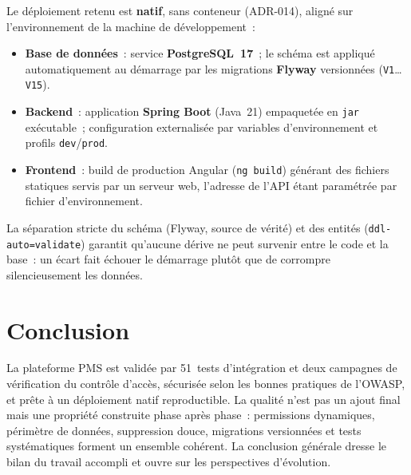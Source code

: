 Le déploiement retenu est \textbf{natif}, sans conteneur (ADR-014), aligné sur l'environnement de la
machine de développement~:

\begin{itemize}
  \item \textbf{Base de données}~: service \textbf{PostgreSQL~17}~; le schéma est appliqué
        automatiquement au démarrage par les migrations \textbf{Flyway} versionnées
        (\texttt{V1}\dots\texttt{V15}).
  \item \textbf{Backend}~: application \textbf{Spring Boot} (Java~21) empaquetée en \texttt{jar}
        exécutable~; configuration externalisée par variables d'environnement et profils
        \texttt{dev}/\texttt{prod}.
  \item \textbf{Frontend}~: build de production Angular (\texttt{ng build}) générant des fichiers
        statiques servis par un serveur web, l'adresse de l'API étant paramétrée par fichier
        d'environnement.
\end{itemize}

\noindent La séparation stricte du schéma (Flyway, source de vérité) et des entités
(\texttt{ddl-auto=validate}) garantit qu'aucune dérive ne peut survenir entre le code et la base~:
un écart fait échouer le démarrage plutôt que de corrompre silencieusement les données.

\section*{Conclusion}
La plateforme PMS est validée par 51~tests d'intégration et deux campagnes de vérification du
contrôle d'accès, sécurisée selon les bonnes pratiques de l'OWASP, et prête à un déploiement natif
reproductible. La qualité n'est pas un ajout final mais une propriété construite phase après phase~:
permissions dynamiques, périmètre de données, suppression douce, migrations versionnées et tests
systématiques forment un ensemble cohérent. La conclusion générale dresse le bilan du travail
accompli et ouvre sur les perspectives d'évolution.
